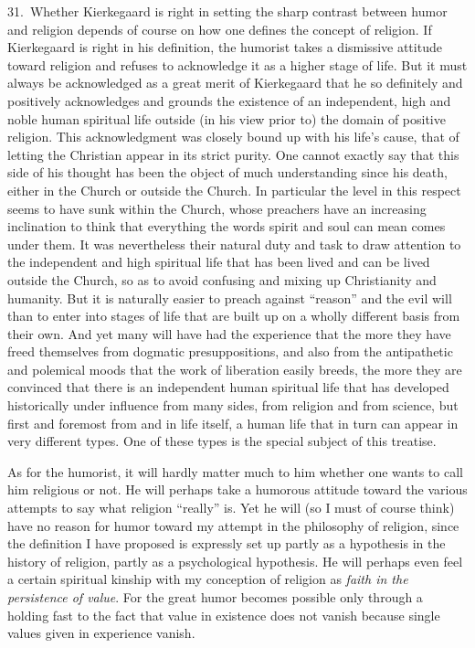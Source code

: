 \documentclass[12pt]{book}
\newcommand{\opage}[1]{\marginnote{\footnotesize\textit{[#1]}}}
\begin{document}
31.~Whether Kierkegaard is right in setting the sharp contrast between humor and religion
depends of course on how one defines the concept of religion. If Kierkegaard is right in his
definition, the humorist takes a dismissive attitude toward religion and refuses to
acknowledge it as a higher stage of life. But it must always be acknowledged as a great merit
of Kierkegaard that he so definitely and positively acknowledges and grounds the existence of
an independent, high and noble human spiritual life outside (in his view prior to) the domain
of positive religion. This acknowledgment was closely bound up with his life's cause, that of
letting the Christian appear in its strict purity. One cannot exactly say that this side of
his thought has been the object of much understanding since his death, either in the Church
or outside the Church. In particular the level in this respect seems to have sunk within the
Church, whose preachers have an increasing inclination to think that everything the words
spirit and soul can mean comes under them. It was nevertheless their natural duty and task to
draw attention to the independent and high spiritual life that has been lived and can be
lived outside the Church, so as to avoid confusing and mixing up Christianity and humanity.
But it is naturally easier to preach against ``reason'' and the evil will than to enter into
stages of life that are built up on \opage{109}a wholly different basis from their own. And
yet many will have had the experience that the more they have freed themselves from dogmatic
presuppositions, and also from the antipathetic and polemical moods that the work of
liberation easily breeds, the more they are convinced that there is an independent human
spiritual life that has developed historically under influence from many sides, from
religion and from science, but first and foremost from and in life itself, a human life that
in turn can appear in very different types. One of these types is the special subject of
this treatise.

As for the humorist, it will hardly matter much to him whether one wants to call him
religious or not. He will perhaps take a humorous attitude toward the various attempts to say
what religion ``really'' is. Yet he will (so I must of course think) have no reason for humor
toward my attempt in the philosophy of religion, since the definition I have proposed is
expressly set up partly as a hypothesis in the history of religion, partly as a
psychological hypothesis. He will perhaps even feel a certain spiritual kinship with my
conception of religion as \emph{faith in the persistence of value}. For the great humor
becomes possible only through a holding fast to the fact that value in existence does not
vanish because single values given in experience vanish.
\end{document}
